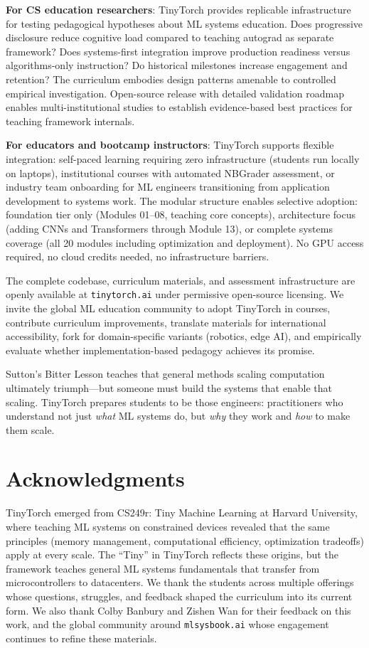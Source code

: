 \documentclass[10pt,twocolumn]{article}
\begin{document}
\textbf{For CS education researchers}: TinyTorch provides replicable infrastructure for testing pedagogical hypotheses about ML systems education. Does progressive disclosure reduce cognitive load compared to teaching autograd as separate framework? Does systems-first integration improve production readiness versus algorithms-only instruction? Do historical milestones increase engagement and retention? The curriculum embodies design patterns amenable to controlled empirical investigation. Open-source release with detailed validation roadmap enables multi-institutional studies to establish evidence-based best practices for teaching framework internals.

\textbf{For educators and bootcamp instructors}: TinyTorch supports flexible integration: self-paced learning requiring zero infrastructure (students run locally on laptops), institutional courses with automated NBGrader assessment, or industry team onboarding for ML engineers transitioning from application development to systems work. The modular structure enables selective adoption: foundation tier only (Modules 01--08, teaching core concepts), architecture focus (adding CNNs and Transformers through Module 13), or complete systems coverage (all 20 modules including optimization and deployment). No GPU access required, no cloud credits needed, no infrastructure barriers.

The complete codebase, curriculum materials, and assessment infrastructure are openly available at \texttt{tinytorch.ai} under permissive open-source licensing. We invite the global ML education community to adopt TinyTorch in courses, contribute curriculum improvements, translate materials for international accessibility, fork for domain-specific variants (robotics, edge AI), and empirically evaluate whether implementation-based pedagogy achieves its promise.

Sutton's Bitter Lesson teaches that general methods scaling computation ultimately triumph---but someone must build the systems that enable that scaling. TinyTorch prepares students to be those engineers: practitioners who understand not just \emph{what} ML systems do, but \emph{why} they work and \emph{how} to make them scale.

\section*{Acknowledgments}

TinyTorch emerged from CS249r: Tiny Machine Learning at Harvard University, where teaching ML systems on constrained devices revealed that the same principles (memory management, computational efficiency, optimization tradeoffs) apply at every scale. The ``Tiny'' in TinyTorch reflects these origins, but the framework teaches general ML systems fundamentals that transfer from microcontrollers to datacenters. We thank the students across multiple offerings whose questions, struggles, and feedback shaped the curriculum into its current form. We also thank Colby Banbury and Zishen Wan for their feedback on this work, and the global community around \texttt{mlsysbook.ai} whose engagement continues to refine these materials.
\end{document}
